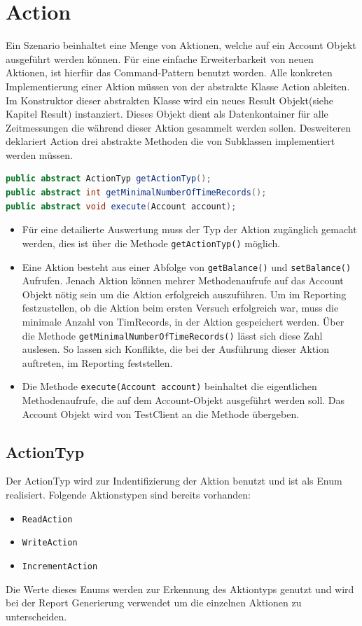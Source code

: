 \section{Action}
\label{sec:action}
Ein Szenario beinhaltet eine Menge von Aktionen, welche auf ein Account Objekt ausgeführt werden können. Für eine einfache Erweiterbarkeit von neuen Aktionen, ist hierfür das Command-Pattern benutzt worden. Alle konkreten Implementierung einer Aktion müssen von der abstrakte Klasse Action ableiten. Im Konstruktor dieser abstrakten Klasse wird ein neues Result Objekt(siehe Kapitel Result) instanziert. Dieses Objekt dient als Datenkontainer für alle Zeitmessungen die während dieser Aktion gesammelt werden sollen. Desweiteren deklariert Action drei abstrakte Methoden die von Subklassen implementiert werden müssen.
\begin{lstlisting}[language=java, breaklines=true] 	
public abstract ActionTyp getActionTyp();
public abstract int getMinimalNumberOfTimeRecords();
public abstract void execute(Account account);	
\end{lstlisting}

\begin{itemize}
\item Für eine detailierte Auswertung muss der Typ der Aktion zugänglich gemacht werden, dies ist über die Methode \verb+getActionTyp()+ möglich.
\item Eine Aktion be\-steht aus einer Ab\-folge von \texttt{get\allowbreak Balance()} und \texttt{set\allowbreak Balance()} Auf\-rufen. Jenach Aktion können mehrer Methodenaufrufe auf das Account Objekt nötig sein um die Aktion erfolgreich aus\-zu\-füh\-ren. Um im Reporting fest\-zu\-stellen, ob die Aktion beim ersten Versuch erfolg\-reich war, muss die minimale Anzahl von Tim\-Records, in der Aktion ge\-speichert werden. Über die Me\-tho\-de \texttt{get\allowbreak Minimal\allowbreak Number\allowbreak Of\allowbreak Time\allowbreak Records()} lässt sich diese Zahl auslesen. So lassen sich Konflikte, die bei der Ausführung dieser Aktion auftreten, im Reporting feststellen.
\item Die Methode \verb+execute(Account account)+ beinhaltet die eigentlichen Methodenaufrufe, die auf dem Account-Objekt ausgeführt werden soll. Das Account Objekt wird von TestClient an die Methode übergeben.
\end{itemize} 

\subsection{ActionTyp}
\label{sec:actionTyp}
Der ActionTyp wird zur Indentifizierung der Aktion benutzt und ist als Enum realisiert. Folgende Aktionstypen sind bereits vorhanden:
\begin{itemize}
\item \verb+ReadAction+
\item \verb+WriteAction+
\item \verb+IncrementAction+
\end{itemize}
Die Werte dieses Enums werden zur Erkennung des Aktiontyps genutzt und wird bei der Report Generierung verwendet um die einzelnen Aktionen zu unterscheiden.

